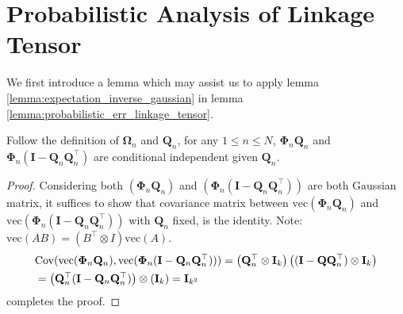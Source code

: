 \section{Probabilistic Analysis of Linkage Tensor}
We first introduce a lemma which may assist us to apply lemma \ref{lemma:expectation_inverse_gaussian} in lemma \ref{lemma:probabilistic_err_linkage_tensor}. 
\begin{lem}
\label{lemma:indepence_for_pseduo_inverse}
Follow the definition of $\mathbf{\Omega}_n$ and $\mathbf{Q}_n$, 
for any $1\le n\le N$, $\mathbf{\Phi}_n \mathbf{Q}_n$ and 
$\mathbf{\Phi}_n (\mathbf{I} - \mathbf{Q}_n\mathbf{Q}_n^\top)$ are conditional independent given $\mathbf{Q}_n$. 
\begin{proof}
Considering both $(\mathbf{\Phi}_n \mathbf{Q}_n)$ and $(\mathbf{\Phi}_n (\mathbf{I} -\mathbf{Q}_n\mathbf{Q}_n^\top))$ are both Gaussian matrix, it suffices to show that covariance matrix between $\mbox{vec}(\mathbf{\Phi}_n \mathbf{Q}_n)$ and $\mbox{vec}(\mathbf{\Phi}_n (\mathbf{I} -\mathbf{Q}_n\mathbf{Q}_n^\top))$ with $\mathbf{Q}_n$ fixed, is the identity. Note: $\mbox{vec}(AB) = (B^\top \otimes I)\mbox{vec}(A)$. 
\begin{equation}
\begin{aligned}
&\mbox{Cov}(\mbox{vec}(\mathbf{\Phi}_n \mathbf{Q}_n), \mbox{vec}(\mathbf{\Phi}_n (\mathbf{I} -\mathbf{Q}_n\mathbf{Q}_n^\top)))  = \left(\mathbf{Q}_n^\top \otimes \mathbf{I}_k\right)\left((\mathbf{I} - \mathbf{Q}\mathbf{Q}_n^\top) \otimes \mathbf{I}_k\right)\\
&=\left(\mathbf{Q}_n^\top(\mathbf{I} - \mathbf{Q}_n\mathbf{Q}_n^\top)  \right)\otimes \left(\mathbf{I}_k\right) = \mathbf{I}_{k^2} 
\end{aligned}
\end{equation}
completes the proof. 
\end{proof}
\end{lem}

